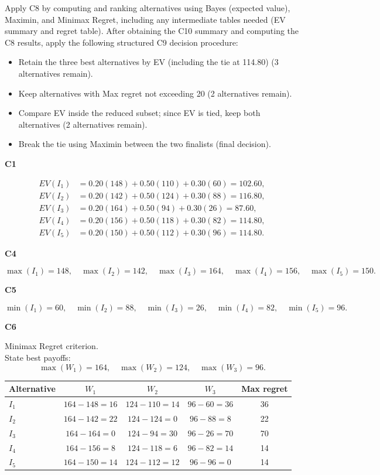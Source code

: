 \begin{ExamProblems}
		Apply C8 by computing and ranking alternatives using Bayes (expected value), Maximin, and Minimax Regret, including any intermediate tables needed (EV summary and regret table).
		After obtaining the C10 summary and computing the C8 results, apply the following structured C9 decision procedure:
		\begin{itemize}
			\item Retain the three best alternatives by EV (including the tie at 114.80) (3 alternatives remain).
			\item Keep alternatives with Max regret not exceeding 20 (2 alternatives remain).
			\item Compare EV inside the reduced subset; since EV is tied, keep both alternatives (2 alternatives remain).
			\item Break the tie using Maximin between the two finalists (final decision).
		\end{itemize}
		
		\vspace{0.25cm}
		
		\textbf{C1}\par
				\[
		\begin{aligned}
			EV(I_1)&=0.20(148)+0.50(110)+0.30(60)=102.60,\\
			EV(I_2)&=0.20(142)+0.50(124)+0.30(88)=116.80,\\
			EV(I_3)&=0.20(164)+0.50(94)+0.30(26)=87.60,\\
			EV(I_4)&=0.20(156)+0.50(118)+0.30(82)=114.80,\\
			EV(I_5)&=0.20(150)+0.50(112)+0.30(96)=114.80.
		\end{aligned}
		\]
		

		\textbf{C4}\par
				\[
		\max(I_1)=148,\quad \max(I_2)=142,\quad \max(I_3)=164,\quad \max(I_4)=156,\quad \max(I_5)=150.
		\]
		

		\textbf{C5}\par
				\[
		\min(I_1)=60,\quad \min(I_2)=88,\quad \min(I_3)=26,\quad \min(I_4)=82,\quad \min(I_5)=96.
		\]
		


		\textbf{C6}\par
		Minimax Regret criterion.\\
				State best payoffs:
		\[
		\max(W_1)=164,\quad \max(W_2)=124,\quad \max(W_3)=96.
		\]
		\begin{center}
			\begin{tabular}{l c c c c}
				\toprule
				Alternative & $W_1$ & $W_2$ & $W_3$ & Max regret \\
				\midrule
				$I_1$ & $164-148=16$ & $124-110=14$ & $96-60=36$ & 36 \\
				$I_2$ & $164-142=22$ & $124-124=0$ & $96-88=8$ & 22 \\
				$I_3$ & $164-164=0$ & $124-94=30$ & $96-26=70$ & 70 \\
				$I_4$ & $164-156=8$ & $124-118=6$ & $96-82=14$ & 14 \\
				$I_5$ & $164-150=14$ & $124-112=12$ & $96-96=0$ & 14 \\
				\bottomrule
			\end{tabular}
		\end{center}
		


\end{ExamProblems}
